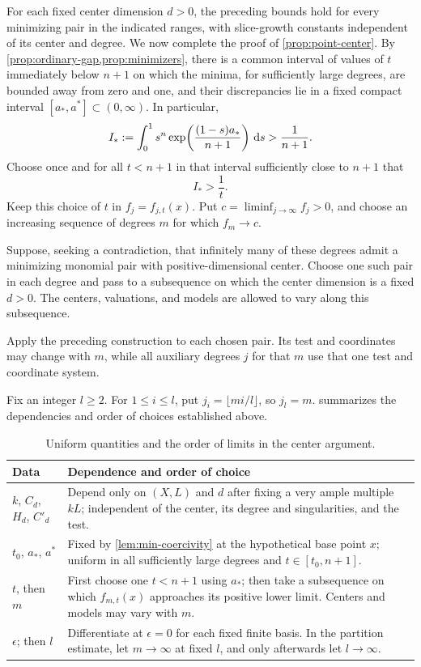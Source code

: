 For each fixed center dimension $d>0$, the preceding bounds hold for every minimizing pair in the indicated ranges, with slice-growth constants independent of its center and degree. We now complete the proof of \cref{prop:point-center}. By \cref{prop:ordinary-gap,prop:minimizers}, there is a common interval of values of $t$ immediately below $n+1$ on which the minima, for sufficiently large degrees, are bounded away from zero and one, and their discrepancies lie in a fixed compact interval $[a_*,a^*]\subset(0,\infty)$. In particular,
\[
 I_*:=\int_0^1 s^n
       \exp\!\left(\frac{(1-s)a_*}{n+1}\right)\,\mathrm{d} s
       >\frac1{n+1}.
\]
Choose once and for all $t<n+1$ in that interval sufficiently close to $n+1$ that
\begin{equation}\label{eq:center-choose-t}
 I_*>\frac1t.
\end{equation}
Keep this choice of $t$ in $f_j=f_{j,t}(x)$. Put $c=\liminf_{j\to\infty}f_j>0$, and choose an increasing sequence of degrees $m$ for which $f_m\to c$.

Suppose, seeking a contradiction, that infinitely many of these degrees admit a minimizing monomial pair with positive-dimensional center. Choose one such pair in each degree and pass to a subsequence on which the center dimension is a fixed $d>0$. The centers, valuations, and models are allowed to vary along this subsequence.

Apply the preceding construction to each chosen pair. Its test and coordinates may change with $m$, while all auxiliary degrees $j$ for that $m$ use that one test and coordinate system.

Fix an integer $l\ge2$. For $1\le i\le l$, put $j_i=\lfloor mi/l\rfloor$, so $j_l=m$.  summarizes the dependencies and order of choices established above.

\begin{table}[tbp]
\centering
\small
\begin{tabular}{@{}p{}p{}@{}}
\toprule
Data & Dependence and order of choice \\
\midrule
$k$, $C_d$, $H_d$, $C'_d$ & Depend only on $(X,L)$ and $d$ after
  fixing a very ample multiple $kL$; independent of the center,
  its degree and singularities, and the test. \\[3pt]
$t_0$, $a_*$, $a^*$ & Fixed by \cref{lem:min-coercivity} at the
  hypothetical base point $x$; uniform in all sufficiently large degrees
  and $t\in[t_0,n+1]$. \\[3pt]
$t$, then $m$ & First choose one $t<n+1$ using $a_*$; then take a
  subsequence on which $f_{m,t}(x)$ approaches its positive lower limit.
  Centers and models may vary with $m$. \\[3pt]
$\epsilon$; then $l$ & Differentiate at $\epsilon=0$ for each fixed
  finite basis. In the partition estimate, let $m\to\infty$ at fixed
  $l$, and only afterwards let $l\to\infty$. \\
\bottomrule
\end{tabular}
\caption{Uniform quantities and the order of limits in the center argument.}
\label{tab:constants}
\end{table}

